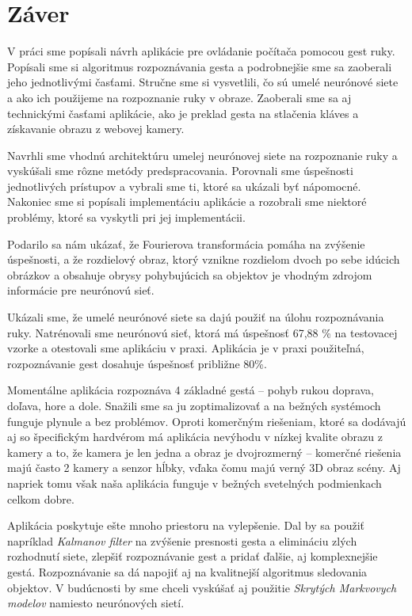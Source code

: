 \chapter*{Záver}\label{chap:conc}
{}

V práci sme popísali návrh aplikácie pre ovládanie počítača pomocou gest ruky. Popísali sme si algoritmus rozpoznávania gesta a podrobnejšie sme sa zaoberali jeho jednotlivými časťami. Stručne sme si vysvetlili, čo sú umelé neurónové siete a ako ich použijeme na rozpoznanie ruky v obraze. Zaoberali sme sa aj technickými časťami aplikácie, ako je preklad gesta na stlačenia kláves a získavanie obrazu z webovej kamery.

Navrhli sme vhodnú architektúru umelej neurónovej siete na rozpoznanie ruky a vyskúšali sme rôzne metódy predspracovania. Porovnali sme úspešnosti jednotlivých prístupov a vybrali sme ti, ktoré sa ukázali byť nápomocné. Nakoniec sme si popísali implementáciu aplikácie a rozobrali sme niektoré problémy, ktoré sa vyskytli pri jej implementácii.

Podarilo sa nám ukázať, že Fourierova transformácia pomáha na zvýšenie úspešnosti, a že rozdielový obraz, ktorý vznikne rozdielom dvoch po sebe idúcich obrázkov a obsahuje obrysy pohybujúcich sa objektov je vhodným zdrojom informácie pre neurónovú sieť. 

Ukázali sme, že umelé neurónové siete sa dajú použiť na úlohu rozpoznávania ruky. Natrénovali sme neurónovú sieť, ktorá má úspešnosť 67,88 \% na testovacej vzorke a otestovali sme aplikáciu v praxi. Aplikácia je v praxi použiteľná, rozpoznávanie gest dosahuje úspešnosť približne 80\%.

Momentálne aplikácia rozpoznáva 4 základné gestá -- pohyb rukou doprava, doľava, hore a dole. Snažili sme sa ju zoptimalizovať a na bežných systémoch funguje plynule a bez problémov. Oproti komerčným riešeniam, ktoré sa dodávajú aj so špecifickým hardvérom má aplikácia nevýhodu v nízkej kvalite obrazu z kamery a to, že kamera je len jedna a obraz je dvojrozmerný -- komerčné riešenia majú často 2 kamery a senzor hĺbky, vďaka čomu majú verný 3D obraz scény. Aj napriek tomu však naša aplikácia funguje v bežných svetelných podmienkach celkom dobre.

Aplikácia poskytuje ešte mnoho priestoru na vylepšenie. Dal by sa použiť napríklad \textit{Kalmanov filter} na zvýšenie presnosti gesta a elimináciu zlých rozhodnutí siete, zlepšiť rozpoznávanie gest a pridať ďalšie, aj komplexnejšie gestá. Rozpoznávanie sa dá napojiť aj na kvalitnejší algoritmus sledovania objektov. V budúcnosti by sme chceli vyskúšať aj použitie \textit{Skrytých Markvovych modelov} namiesto neurónových sietí.

